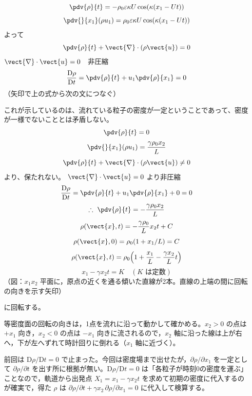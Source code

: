 \[ \pdv{\rho}{t}=-\rho_{0}\varepsilon\kappa U\cos(\kappa(x_{1}-Ut)) \]
\[ \pdv{}{x_{1}}(\rho u_{1})=\rho_{0}\varepsilon\kappa U\cos(\kappa(x_{1}-Ut)) \]
よって
\[ \pdv{\rho}{t}+\vect{\nabla}\cdot(\rho\vect{u})=0 \]
$\vect{\nabla}\cdot\vect{u}=0$　非圧縮
\[ \frac{\mathrm{D}\rho}{\mathrm{D}t}=\pdv{\rho}{t}+u_{1}\pdv{\rho}{x_{1}}=0 \]
（矢印で上の式から次の文につなぐ）

これが示しているのは、流れている粒子の密度が一定ということであって、密度が一様でないこととは矛盾しない。
\[ \pdv{\rho}{t}=0 \]
\[ \pdv{}{x_{1}}(\rho u_{1})=\frac{\gamma\rho_{0}x_{2}}{L} \]
\[ \pdv{\rho}{t}+\vect{\nabla}\cdot(\rho\vect{u})\neq0 \]
より、保たれない。
$\vect{\nabla}\cdot\vect{u}=0$ より非圧縮
\[ \frac{\mathrm{D}\rho}{\mathrm{D}t}=\pdv{\rho}{t}+u_{1}\pdv{\rho}{x_{1}}+0=0 \]
\[ \therefore\ \pdv{\rho}{t}=-\frac{\gamma\rho_{0}x_{2}}{L} \]
\[ \rho(\vect{x},t)=-\frac{\gamma\rho_{0}}{L}x_{2}t+C \]
\[ \rho(\vect{x},0)=\rho_{0}(1+x_{1}/L)=C \]
\[ \rho(\vect{x},t)=\rho_{0}\Bigl(1+\frac{x_{1}}{L}-\frac{\gamma x_{2}}{L}t\Bigr) \]
\[ x_{1}-\gamma x_{2}t=K\quad (K\text{ は定数}) \]
（図：$x_{1}x_{2}$ 平面に，原点の近くを通る傾いた直線が2本。直線の上端の間に回転の向きを示す矢印）

に回転する。
\item 等密度面の回転の向きは，1点を流れに沿って動かして確かめる。$x_{2}>0$ の点は $+x_{1}$ 向き，$x_{2}<0$ の点は $-x_{1}$ 向きに流されるので，$x_{2}$ 軸に沿った線は上が右へ，下が左へずれて時計回りに倒れる（$x_{1}$ 軸に近づく）。
\item {}前回は $\mathrm{D}\rho/\mathrm{D}t=0$ で止まった。今回は密度場まで出せたが，$\partial\rho/\partial x_{1}$ を一定として $\partial\rho/\partial t$ を出す所に根拠が無い。$\mathrm{D}\rho/\mathrm{D}t=0$ は「各粒子が時刻0の密度を運ぶ」ことなので，軌道から出発点 $X_{1}=x_{1}-\gamma x_{2}t$ を求めて初期の密度に代入するのが確実で，得た $\rho$ は $\partial\rho/\partial t+\gamma x_{2}\,\partial\rho/\partial x_{1}=0$ に代入して検算する。
